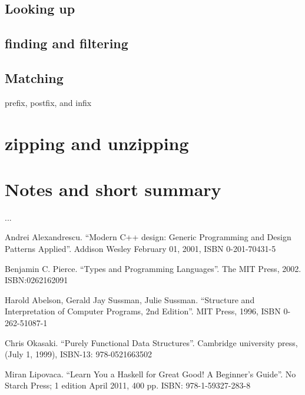 \documentclass{article}
\begin{document}
\subsection{Looking up}

\subsection{finding and filtering}



\subsection{Matching}

prefix, postfix, and infix

\section{zipping and unzipping}

\section{Notes and short summary}
...


\begin{thebibliography}{99}

Andrei Alexandrescu. ``Modern C++ design: Generic Programming and Design Patterns Applied''. Addison Wesley February 01, 2001, ISBN 0-201-70431-5

Benjamin C. Pierce. ``Types and Programming Languages''. The MIT Press, 2002. ISBN:0262162091

Harold Abelson, Gerald Jay Sussman, Julie Sussman. ``Structure and Interpretation of Computer Programs, 2nd Edition''. MIT Press, 1996, ISBN 0-262-51087-1

Chris Okasaki. ``Purely Functional Data Structures''. Cambridge university press, (July 1, 1999), ISBN-13: 978-0521663502

Miran Lipovaca. ``Learn You a Haskell for Great Good! A Beginner's Guide''. No Starch Press; 1 edition April 2011, 400 pp. ISBN: 978-1-59327-283-8

\end{thebibliography}

\ifx\wholebook\relax \else
\end{document}
